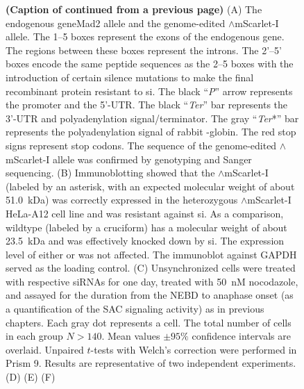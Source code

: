 \begin{figure}
    \noindent\justifying \textbf{(Caption of  continued from a previous page)} (A) The endogenous gene{Mad2} allele and the genome-edited $\wedge$mScarlet-I allele. The 1--5 boxes represent the exons of the endogenous  gene. The regions between these boxes represent the introns. The 2'--5' boxes encode the same peptide sequences as the 2--5 boxes with the introduction of certain silence mutations to make the final recombinant protein resistant to si. The black ``\textit{P}'' arrow represents the promoter and the 5'-UTR. The black ``\textit{Ter}'' bar represents the 3'-UTR and polyadenylation signal/terminator. The gray ``\textit{Ter}*'' bar represents the polyadenylation signal of rabbit \textbeta{}-globin. The red stop signs represent stop codons. The sequence of the genome-edited $\wedge$mScarlet-I allele was confirmed by genotyping and Sanger sequencing. (B) Immunoblotting showed that the $\wedge$mScarlet-I (labeled by an asterisk, with an expected molecular weight of about \SI{51.0}{kDa}) was correctly expressed in the heterozygous $\wedge$mScarlet-I HeLa-A12 cell line and was resistant against si. As a comparison, wildtype  (labeled by a cruciform) has a molecular weight of about \SI{23.5}{kDa} and was effectively knocked down by si. The expression level of either  or  was not affected. The immunoblot against GAPDH served as the loading control. (C) Unsynchronized cells were treated with respective siRNAs for one day, treated with \SI{50}{nM} nocodazole, and assayed for the duration from the NEBD to anaphase onset (as a quantification of the SAC signaling activity) as in previous chapters. Each gray dot represents a cell. The total number of cells in each group $N > 140$. Mean values $\pm 95\%$ confidence intervals are overlaid. Unpaired $t$-tests with Welch's correction were performed in Prism 9. Results are representative of two independent experiments. (D) (E) (F)
\end{figure}

